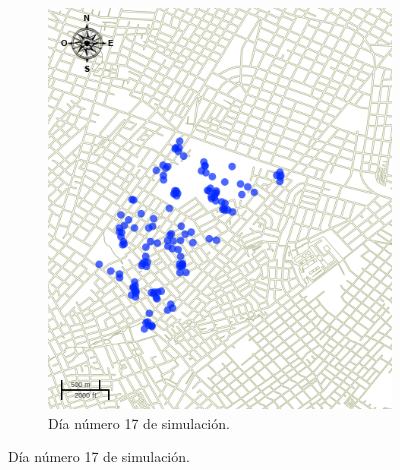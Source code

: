 \begin{figure}[!htbp]
\begin{subfigure}[b]{0.45\textwidth}
            \includegraphics[width=\textwidth]{capitulo-6/graphics/raster/temp-24-16.png}
            \caption{\label{fig:niveles-infestacion-24-b}Día número 17 de simulación.}
    \end{subfigure}


\end{figure}
